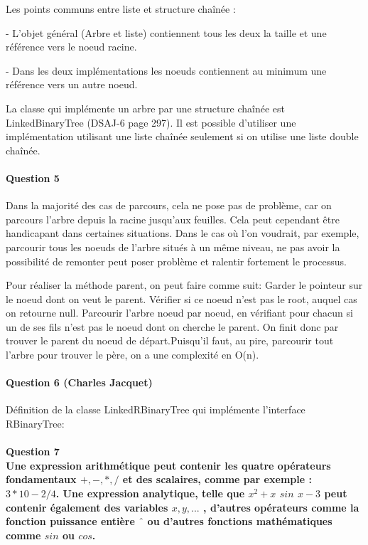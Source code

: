 \documentclass[a4paper]{article}
\begin{document}
Les points communs entre liste et structure chaînée :

- L’objet général (Arbre et liste) contiennent tous les deux la taille et une référence vers le noeud racine.

- Dans les deux implémentations les noeuds contiennent au minimum une référence vers un autre noeud.

La classe qui implémente un arbre par une structure chaînée est LinkedBinaryTree (DSAJ-6 page 297). Il est possible d’utiliser une implémentation utilisant une liste chaînée seulement si on utilise une liste double chaînée.

\paragraph{Question 5}

Dans la majorité des cas de parcours, cela ne pose pas de problème, car on parcours l'arbre depuis la racine jusqu'aux feuilles. Cela peut cependant être handicapant dans certaines situations. Dans le cas où l'on voudrait, par exemple, parcourir tous les noeuds de l'arbre situés à un même niveau, ne pas avoir la possibilité de remonter peut poser problème et ralentir fortement le processus.

Pour réaliser la méthode parent, on peut faire comme suit: Garder le pointeur sur le noeud dont on veut le parent.
Vérifier si ce noeud n'est pas le root, auquel cas on retourne null.
Parcourir l'arbre noeud par noeud, en vérifiant pour chacun si un de ses fils n'est pas le noeud dont on cherche le parent. 
On finit donc par trouver le parent du noeud de départ.Puisqu'il faut, au pire, parcourir tout l'arbre pour trouver le père, on a une complexité en O(n).

\paragraph{Question 6 (Charles Jacquet)}


Définition de la classe LinkedRBinaryTree qui implémente l'interface RBinaryTree:



\paragraph{Question 7\\	Une expression arithmétique peut contenir les quatre opérateurs fondamentaux
	$ +,-,*,/ $ et des scalaires, comme par exemple : $ 3 * 10 - 2/4 $. Une expression
	analytique, telle que $ x^{2}+x$ $ sin $ $ x-3 $ peut contenir également des variables $ x,y,... $ ,
	d’autres opérateurs comme la fonction puissance entière $ ˆ $ ou d’autres fonctions
	mathématiques comme $ sin $ ou $ cos $.\\}
\end{document}
